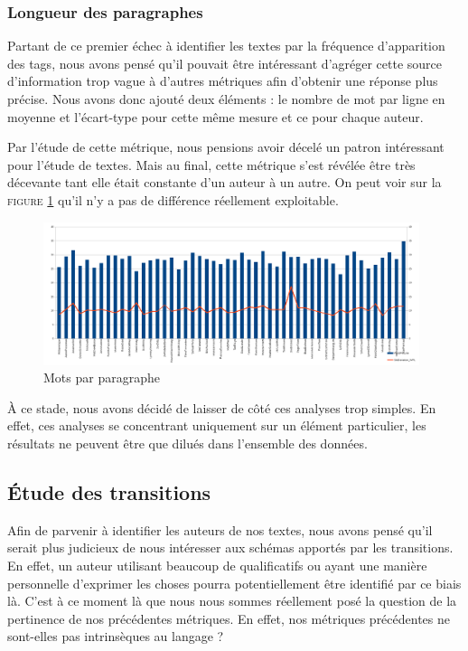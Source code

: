 \documentclass[a4paper]{article}
\begin{document}


\subsubsection{Longueur des paragraphes}

Partant de ce premier échec à identifier les textes par la fréquence d'apparition des tags, nous avons pensé qu'il pouvait être intéressant d’agréger cette source d'information trop vague à d'autres métriques afin d'obtenir une réponse plus précise. Nous avons donc ajouté deux éléments : le nombre de mot par ligne en moyenne et l'écart-type pour cette même mesure et ce pour chaque auteur.

Par l'étude de cette métrique, nous pensions avoir décelé un patron intéressant pour l'étude de textes. Mais au final, cette métrique s'est révélée être très décevante tant elle était constante d'un auteur à un autre. On peut voir sur la \textsc{figure \ref{WPL}} qu'il n'y a pas de différence réellement exploitable.
				
\begin{figure}[hbtp]
\centering
\includegraphics[width=11cm]{fig/WPL.png}
\caption{Mots par paragraphe}
\label{WPL}
\end{figure}

À ce stade, nous avons décidé de laisser de côté ces analyses trop simples. En effet, ces analyses se concentrant uniquement sur un élément particulier, les résultats ne peuvent être que dilués dans l'ensemble des données.


\subsection{Étude des transitions}

Afin de parvenir à identifier les auteurs de nos textes, nous avons pensé qu'il serait plus judicieux de nous intéresser aux schémas apportés par les transitions. En effet, un auteur utilisant beaucoup de qualificatifs ou ayant une manière personnelle d'exprimer les choses pourra potentiellement être identifié par ce biais là. C'est à ce moment là que nous nous sommes réellement posé la question de la pertinence de nos précédentes métriques. En effet, nos métriques précédentes ne sont-elles pas intrinsèques au langage ?
\end{document}

